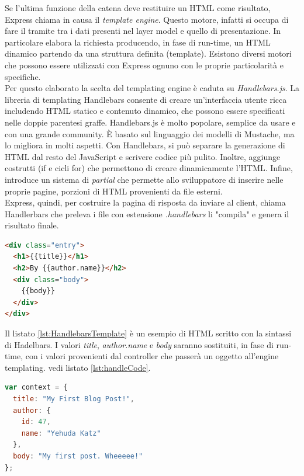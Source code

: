 Se l'ultima funzione della catena deve restituire un HTML come risultato, Express chiama in causa il \textit{template engine}. Questo motore, infatti si occupa di fare il tramite tra i dati presenti nel layer model e quello di presentazione. In particolare elabora la richiesta producendo, in fase di run-time, un HTML dinamico partendo da una struttura definita (template). Esistono diversi motori che possono essere utilizzati con Express ognuno con le proprie particolarità e specifiche. 
\\Per questo elaborato la scelta del templating engine è caduta su \textit{Handlebars.js}. La libreria di templating Handlebars consente di creare un'interfaccia utente ricca includendo HTML statico e contenuto dinamico, che possono essere specificati nelle doppie parentesi graffe. Handlebars.js è molto popolare, semplice da usare e con una grande community. È basato sul linguaggio dei modelli di Mustache, ma lo migliora in molti aspetti. Con Handlebars, si può separare la generazione di HTML dal resto del JavaScript e scrivere codice più pulito. Inoltre, aggiunge costrutti (if e cicli for) che permettono di creare dinamicamente l'HTML. Infine, introduce un sistema di \textit{partial} che permette allo sviluppatore di inserire nelle proprie pagine, porzioni di HTML provenienti da file esterni. 
\\Express, quindi, per costruire la pagina di risposta da inviare al client, chiama Handlerbars che preleva i file con estensione \textit{.handlebars} li "compila" e genera il risultato finale.

\begin{lstlisting}[language=HTML, label=lst:HandlebarsTemplate, caption={Esempio di HTML scritto con Handlebars.}]
<div class="entry">
  <h1>{{title}}</h1>
  <h2>By {{author.name}}</h2>
  <div class="body">
    {{body}}
  </div>
</div>
\end{lstlisting} 

Il listato \ref{lst:HandlebarsTemplate} è un esempio di HTML scritto con la sintassi di Hadelbars. I valori \textit{title}, \textit{author.name} e \textit{body} saranno sostituiti, in fase di run-time, con i valori provenienti dal controller che passerà un oggetto all'engine templating. vedi listato \ref{lst:handleCode}.

\begin{lstlisting}[language=Javascript, label=lst:handleCode, caption={Esempio di variabile passata dal controller al template engine.}]
var context = {
  title: "My First Blog Post!",
  author: {
    id: 47,
    name: "Yehuda Katz"
  },
  body: "My first post. Wheeeee!"
};
\end{lstlisting} 

